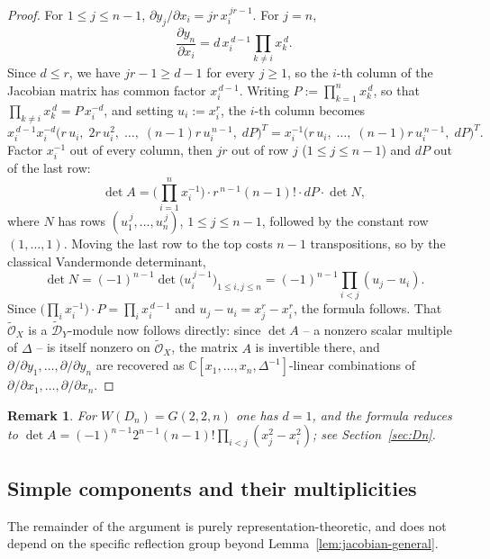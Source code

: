 \documentclass[11pt,a4paper]{article}
\newtheorem{remark}[theorem]{Remark}
\begin{document}
\begin{proof}
For $1 \le j \le n-1$,
$\partial y_j / \partial x_i = j r \, x_i^{\,jr-1}$.
For $j=n$,
\[
 \frac{\partial y_n}{\partial x_i}
 = d\, x_i^{\,d-1} \prod_{k \neq i} x_k^{\,d}.
\]
Since $d \le r$, we have $jr - 1 \ge d-1$ for every $j \ge 1$, so the
$i$-th column of the Jacobian matrix has common factor $x_i^{\,d-1}$.
Writing $P := \prod_{k=1}^n x_k^{\,d}$, so that
$\prod_{k \neq i} x_k^{\,d} = P\, x_i^{-d}$, and setting
$u_i := x_i^{r}$, the $i$-th column becomes
\[
 x_i^{\,d-1} x_i^{-d}
 \big(r\, u_i,\; 2r\, u_i^2,\; \dots,\; (n-1) r\, u_i^{\,n-1},\; d P\big)^{T}
 = x_i^{-1} \big(r\, u_i,\; \dots,\; (n-1) r\, u_i^{\,n-1},\; d P\big)^{T}.
\]
Factor $x_i^{-1}$ out of every column, then $jr$ out of row $j$
($1 \le j \le n-1$) and $dP$ out of the last row:
\[
 \det A
 = \Big(\prod_{i=1}^n x_i^{-1}\Big) \cdot r^{\,n-1}(n-1)! \cdot dP
 \cdot \det N,
\]
where $N$ has rows $(u_1^{\,j}, \dots, u_n^{\,j})$, $1 \le j \le n-1$,
followed by the constant row $(1,\dots,1)$. Moving the last row to the
top costs $n-1$ transpositions, so by the classical Vandermonde
determinant,
\[
 \det N = (-1)^{n-1} \det \big(u_i^{\,j-1}\big)_{1 \le i,j \le n}
 = (-1)^{n-1} \prod_{i<j} (u_j - u_i).
\]
Since $\big(\prod_i x_i^{-1}\big) \cdot P = \prod_i x_i^{\,d-1}$ and
$u_j - u_i = x_j^r - x_i^r$, the formula follows. That
$\widetilde{\mathcal{O}}_X$ is a $\widetilde{\mathcal{D}}_Y$-module
now follows directly: since $\det A$ -- a nonzero scalar multiple of
$\Delta$ -- is itself nonzero on
$\widetilde{\mathcal{O}}_X$, the matrix $A$ is invertible there, and
$\partial/\partial y_1, \dots, \partial/\partial y_n$ are
recovered as $\mathbb{C}[x_1,\dots,x_n,\Delta^{-1}]$-linear
combinations of $\partial/\partial x_1, \dots, \partial/\partial x_n$.
\end{proof}

\begin{remark}
For $W(D_n) = G(2,2,n)$ one has $d=1$, and the formula reduces to
$\det A = (-1)^{n-1} 2^{n-1}(n-1)! \prod_{i<j}(x_j^2 - x_i^2)$; see
Section~\ref{sec:Dn}.
\end{remark}

\subsection{Simple components and their multiplicities}\label{subsec:simple-components}

The remainder of the argument is purely representation-theoretic,
and does not depend on the specific reflection group beyond
Lemma~\ref{lem:jacobian-general}.
\end{document}
